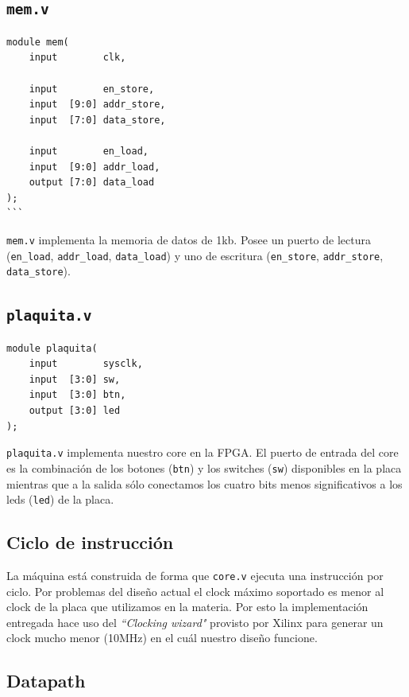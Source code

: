\documentclass{article}
\begin{document}
\subsection{\texttt{mem.v}}
\begin{verbatim}
module mem(
    input        clk,

    input        en_store,
    input  [9:0] addr_store,
    input  [7:0] data_store,

    input        en_load,
    input  [9:0] addr_load,
    output [7:0] data_load
);
```
\end{verbatim}
\texttt{mem.v} implementa la memoria de datos de 1kb. Posee un puerto de lectura (\texttt{en\_load}, \texttt{addr\_load}, \texttt{data\_load}) y uno de escritura (\texttt{en\_store}, \texttt{addr\_store}, \texttt{data\_store}).

\subsection{\texttt{plaquita.v}}
\begin{verbatim}
module plaquita(
    input        sysclk,
    input  [3:0] sw,
    input  [3:0] btn,
    output [3:0] led
);
\end{verbatim}
\texttt{plaquita.v} implementa nuestro core en la FPGA. El puerto de entrada del core es la combinación de los botones (\texttt{btn}) y los switches (\texttt{sw}) disponibles en la placa mientras que a la salida sólo conectamos los cuatro bits menos significativos a los leds (\texttt{led}) de la placa.

\subsection{Ciclo de instrucción}
La máquina está construida de forma que \texttt{core.v} ejecuta una instrucción por ciclo. Por problemas del diseño actual el clock máximo soportado es menor al clock de la placa que utilizamos en la materia. Por esto la implementación entregada hace uso del \emph{``Clocking wizard"} provisto por Xilinx para generar un clock mucho menor (10MHz) en el cuál nuestro diseño funcione.

\subsection{Datapath}
\end{document}
